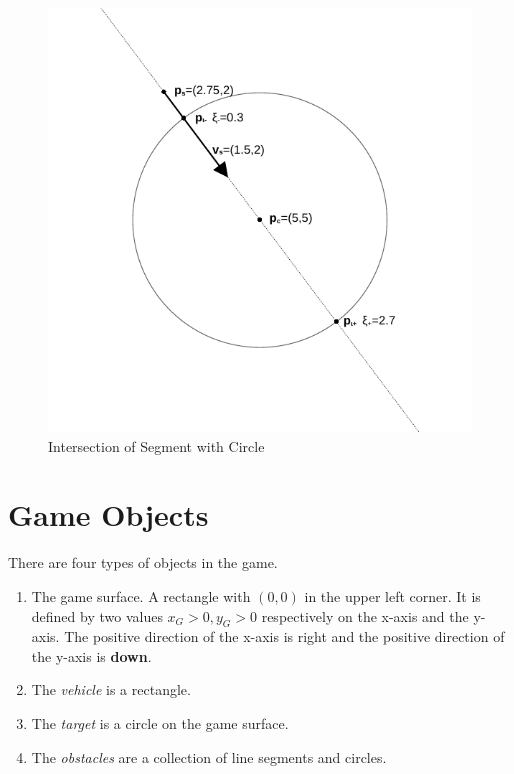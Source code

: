 \documentclass[11pt]{article}
\begin{document}
\begin{figure}
    \centering
    \includegraphics{odg/circle-segment.pdf}
    \caption{Intersection of Segment with Circle}
    \label{fig-intersection-circle}
\end{figure}

\section{Game Objects}
\label{sec-game-objects}
There are four types of objects in the game.
\begin{enumerate}
    \item The game surface. A rectangle with $(0,0)$ in the upper left corner.
        It is defined by two values $x_G > 0, y_G>0$ respectively on the x-axis
        and the y-axis. The positive direction of the x-axis is right and the
        positive direction of the y-axis is \textbf{down}.
    \item The {\sl vehicle} is a rectangle.
    \item The {\sl target} is a circle on the game surface.
    \item The {\sl obstacles} are a collection of line segments and circles.
\end{enumerate}
\end{document}
